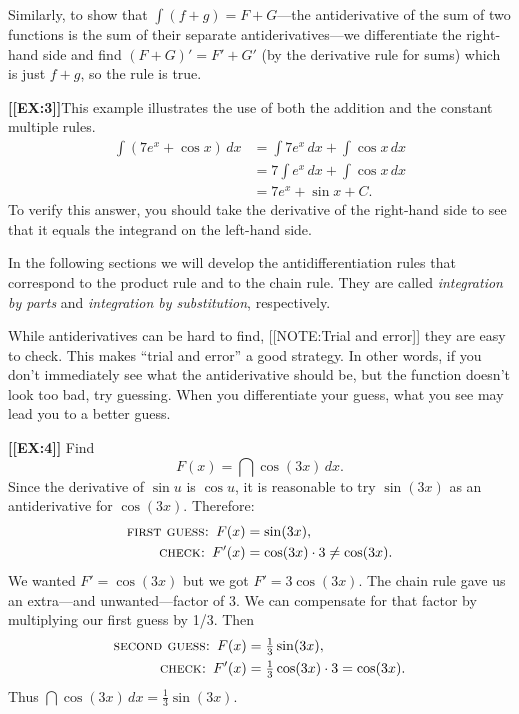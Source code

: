 Similarly, to show that $\int (f+g) = F + G$---the antiderivative of
the sum of two functions is the sum of their separate
antiderivatives---we differentiate the right-hand side and find
$(F+G)'=F'+G'$ (by the derivative rule for sums) which is just $f+g$,
so the rule is true.







{\bf [[EX:3]]}\quad This example illustrates the use of both the
addition and the constant multiple rules.
\begin{align*}
\int (7e^x + \cos{x}) \, dx 
   &= \int 7e^x \, dx + \int \cos{x} \, dx \\
   &= 7 \int e^x \, dx + \int \cos{x} \, dx \\[6pt]
   &= 7 e^x + \sin{x} + C.
\end{align*}
To verify this answer, you should take the derivative of the
right-hand side to see that it equals the integrand on the left-hand
side.



In the following sections we will develop the antidifferentiation
rules that correspond to the product rule and to the chain rule.  They
are called {\em integration by parts\/} and {\em integration by
  substitution},
respectively.

While antiderivatives can be hard to find,
[[NOTE:Trial and error]]
they are easy to check.  This makes ``trial and error'' a good
strategy.  In other words, if you don't immediately see what the
antiderivative should be, but the function doesn't look too bad, try
guessing.  When you differentiate your guess, what you see may lead
you to a better guess.



{\bf [[EX:4]]}\quad \label{`ex4'}  Find 
\[
F(x) = \dint \cos(3x) \, dx.
\] 
Since the derivative of $\sin{u}$ is $\cos{u}$, it is reasonable to
try $\sin(3x)$ as an antiderivative for $\cos(3x)$.  Therefore:
\begin{align*}
\mbox{\sc first guess: } F(x) &= \sin(3x), \\
\mbox{\sc check: } F'(x) &= \cos(3x) \cdot 3 \neq \cos(3x).
\end{align*}
We wanted $F' = \cos(3x)$ but we got $F' = 3\cos(3x)$.  The chain rule
gave us an extra---and unwanted---factor of 3.  We can compensate for
that factor by multiplying our first guess by 1/3.  Then
\begin{align*}
\mbox{\sc second guess: } F(x) &= \tfrac{1}{3}\sin(3x), \\
\mbox{\sc check: } F'(x) &= \tfrac{1}{3}\cos(3x)\cdot 3  = 
		\cos(3x).
\end{align*}
Thus $\dint \cos(3x) \, dx = \tfrac{1}{3}\sin(3x)$.




